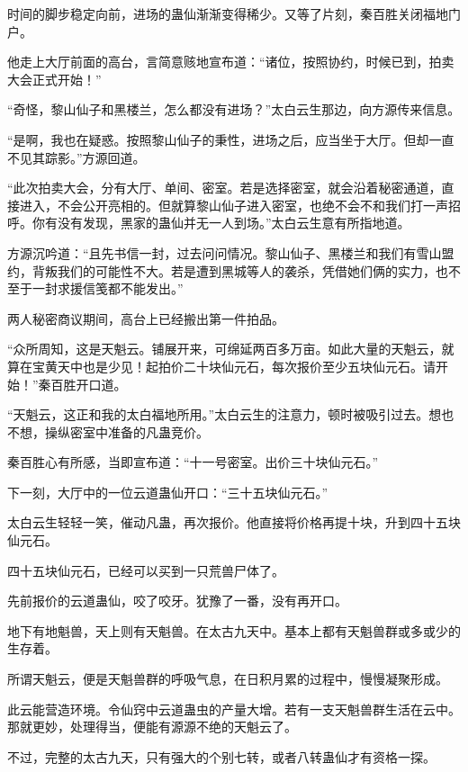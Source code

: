 
\begin{this_body}



时间的脚步稳定向前，进场的蛊仙渐渐变得稀少。又等了片刻，秦百胜关闭福地门户。

他走上大厅前面的高台，言简意赅地宣布道：“诸位，按照协约，时候已到，拍卖大会正式开始！”

“奇怪，黎山仙子和黑楼兰，怎么都没有进场？”太白云生那边，向方源传来信息。

“是啊，我也在疑惑。按照黎山仙子的秉性，进场之后，应当坐于大厅。但却一直不见其踪影。”方源回道。

“此次拍卖大会，分有大厅、单间、密室。若是选择密室，就会沿着秘密通道，直接进入，不会公开亮相的。但就算黎山仙子进入密室，也绝不会不和我们打一声招呼。你有没有发现，黑家的蛊仙并无一人到场。”太白云生意有所指地道。

方源沉吟道：“且先书信一封，过去问问情况。黎山仙子、黑楼兰和我们有雪山盟约，背叛我们的可能性不大。若是遭到黑城等人的袭杀，凭借她们俩的实力，也不至于一封求援信笺都不能发出。”

两人秘密商议期间，高台上已经搬出第一件拍品。

“众所周知，这是天魁云。铺展开来，可绵延两百多万亩。如此大量的天魁云，就算在宝黄天中也是少见！起拍价二十块仙元石，每次报价至少五块仙元石。请开始！”秦百胜开口道。

“天魁云，这正和我的太白福地所用。”太白云生的注意力，顿时被吸引过去。想也不想，操纵密室中准备的凡蛊竞价。

秦百胜心有所感，当即宣布道：“十一号密室。出价三十块仙元石。”

下一刻，大厅中的一位云道蛊仙开口：“三十五块仙元石。”

太白云生轻轻一笑，催动凡蛊，再次报价。他直接将价格再提十块，升到四十五块仙元石。

四十五块仙元石，已经可以买到一只荒兽尸体了。

先前报价的云道蛊仙，咬了咬牙。犹豫了一番，没有再开口。

地下有地魁兽，天上则有天魁兽。在太古九天中。基本上都有天魁兽群或多或少的生存着。

所谓天魁云，便是天魁兽群的呼吸气息，在日积月累的过程中，慢慢凝聚形成。

此云能营造环境。令仙窍中云道蛊虫的产量大增。若有一支天魁兽群生活在云中。那就更妙，处理得当，便能有源源不绝的天魁云了。

不过，完整的太古九天，只有强大的个别七转，或者八转蛊仙才有资格一探。


\end{this_body}
